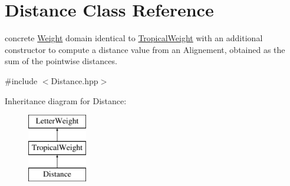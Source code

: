 \hypertarget{classDistance}{}\section{Distance Class Reference}
\label{classDistance}


concrete \mbox{\hyperlink{classWeight}{Weight}} domain identical to \mbox{\hyperlink{classTropicalWeight}{Tropical\+Weight}} with an additional constructor to compute a distance value from an Alignement, obtained as the sum of the pointwise distances.  




{\ttfamily \#include $<$Distance.\+hpp$>$}

Inheritance diagram for Distance\+:\begin{figure}[H]
\begin{center}
\leavevmode
\includegraphics[height=3.000000cm]{classDistance}
\end{center}
\end{figure}
